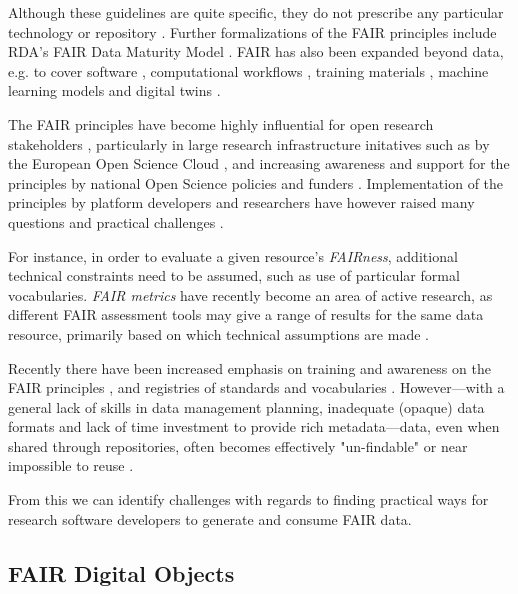 Although these guidelines are quite specific, they do not prescribe any particular technology or repository \cite{Mons 2017}. Further formalizations of the FAIR principles include RDA's FAIR Data Maturity Model \cite{FAIR Maturity 2020,Bahui 2020}. FAIR has also been expanded beyond data, e.g. to cover software \cite{Katz 2021b}, computational workflows \cite{Goble 2020}, training materials \cite{Garcia 2020a}, machine learning models \cite{Duarte 2023} and digital twins \cite{Schultes 2022}. 

The FAIR principles have become highly influential for open research stakeholders \cite{Jacobsen 2020}, particularly in large research infrastructure initatives such as by the European Open Science Cloud  \cite{Schouppe 2018}, and increasing awareness and support for the principles by national Open Science policies and funders \cite{Davidson 2019,Davidson 2022}.
Implementation of the principles by platform developers and researchers have however raised many questions and practical challenges \cite{Mons 2020,Riungu-Kalliosaari 2022}. 

For instance, in order to evaluate a given resource's \emph{FAIRness}, additional technical constraints need to be assumed, such as use of particular formal vocabularies. \emph{FAIR metrics} \cite{Wilkinson 2018,Devaraju 2021} have recently become an area of active research, as different FAIR assessment tools may give a range of results for the same data resource, primarily based on which technical assumptions are made \cite{Wilkinson 2022a,Verburg 2023}.

Recently there have been increased emphasis on training and awareness on the FAIR principles \cite{Shanahan 2021,Rocca-Serra 2023}, and registries of standards and vocabularies \cite{Sansone 2019}.
However---with a general lack of skills in data management planning, inadequate (opaque) data formats and lack of time investment to provide rich metadata---data, even when shared through repositories, often becomes effectively "un-findable" or near impossible to reuse \cite{Carballo-Garcia 2022}.

From this we can identify challenges with regards to finding practical ways for research software developers to generate and consume FAIR data.


\subsection{FAIR Digital Objects}

